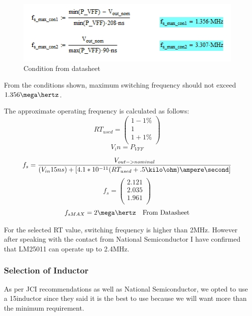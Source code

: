 \begin{figure}[htbp]
\begin{center}
\includegraphics[width=6in]{includes/freq}
\caption{Condition from datasheet}
\label{fig:1}
\end{center}
\end{figure}

From the conditions shown, maximum switching frequency should not exceed $1.356 \mega\hertz$.

The approximate operating frequency is calculated as follows:
\begin{equation}
RT_{used}=\left( \begin{array}{ccc}
1-1\percent \\ 1 \\ 1+1\percent \\
\end{array} \right)
\end{equation}
\begin{equation}
V_in=P_{VFF}
\end{equation}

\begin{equation}
f_s=\frac{V_{out->nominal}}{(V_{in}15ns)+[4.1*10^{-11}(RT_{used}+.5\kilo\ohm)\ampere\second]}
\end{equation}
\begin{equation}
f_s=\left( \begin{array}{ccc}
2.121 \\ 2.035 \\ 1.961 \\ 
\end{array} \right)
\end{equation}
\begin{equation}
f_{sMAX}=2\mega\hertz \quad \hbox{From Datasheet}
\end{equation}

For the selected RT value, switching frequency is higher than 2MHz. However after speaking with the contact from National Semiconductor I have confirmed that LM25011 can operate up to 2.4MHz.

\subsubsection{Selection of Inductor}
As per JCI recommendations as well as National Semiconductor, we opted to use a 15\micro\henry inductor since they said it is the best to use because we will want more than the minimum requirement. 

